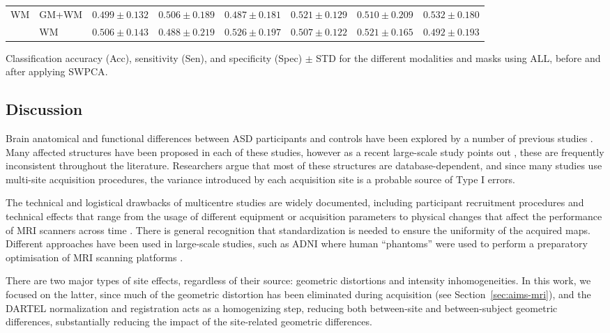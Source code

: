 \begin{bigtable}
\begin{tabularx}{\linewidth}{ll|XXX|XXX}
		\midrule
		\multirow{2}{*}{\ac{WM}} &GM+WM &
		$ 0.499 \pm 0.132 $ & $ 0.506 \pm 0.189 $ & $ 0.487 \pm 0.181 $ & $ 0.521 \pm 0.129 $ & $ 0.510 \pm 0.209 $ &  $ 0.532 \pm 0.180 $ \\
		&
		WM &
		$ 0.506 \pm 0.143 $ & $ 0.488 \pm 0.219 $ & $ 0.526 \pm 0.197 $ & $ 0.507 \pm 0.122 $ & $ 0.521 \pm 0.165 $ &   $ 0.492 \pm 0.193 $ \\
		\bottomrule
	\end{tabularx}
	\caption[Classification accuracy (Acc), sensitivity (Sen), and specificity (Spec) $\pm$ STD for the different modalities and masks using ALL, before and after applying \acs{SWPCA}.]{Classification accuracy (Acc), sensitivity (Sen), and specificity (Spec) $\pm$ STD for the different modalities and masks using ALL, before and after applying \ac{SWPCA}.}
	\label{tab:swpcaALL}
\end{bigtable}

\subsection{Discussion}
Brain anatomical and functional differences between \ac{ASD} participants and controls have been explored by a number of previous studies \cite{DiMartino2014,Ecker2015,Hernandez2015,Lenroot2013,Zuercher2015}. Many affected structures have been proposed in each of these studies, however as a recent large-scale study points out \cite{haar2014anatomical}, these are frequently inconsistent throughout the literature. Researchers argue that most of these structures are database-dependent, and since many studies use multi-site acquisition procedures, the variance introduced by each acquisition site is a probable source of Type I errors. 

The technical and logistical drawbacks of multicentre studies are widely documented, including participant recruitment procedures \cite{Pearlson2009} and technical effects that range from the usage of different equipment or acquisition parameters \cite{VanHorn2009} to physical changes that affect the performance of \ac{MRI} scanners across time \cite{Pearlson2009}. There is general recognition that standardization is needed to ensure the uniformity of the acquired maps. Different approaches have been used in large-scale studies, such as \ac{ADNI} where human ``phantoms'' were used to perform a preparatory optimisation of \ac{MRI} scanning platforms \cite{friedman2006report}. 

There are two major types of site effects, regardless of their source: geometric distortions and intensity inhomogeneities. In this work, we focused on the latter, since much of the geometric distortion has been eliminated during acquisition (see Section~\ref{sec:aims-mri}), and the DARTEL normalization and registration acts as a homogenizing step, reducing both between-site and between-subject geometric differences, substantially reducing the impact of the site-related geometric differences. 


